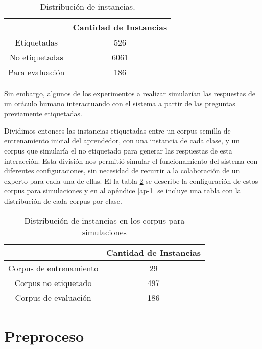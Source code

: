 \begin{table}[h!]
\centering
\begin{tabular}{c c}
     & Cantidad de Instancias\\ [0.5ex]
    \hline
    Etiquetadas & 526 \\ [0.5ex]
    No etiquetadas & 6061 \\ [0.5ex]
    Para evaluación & 186 \\[1ex]
    \hline
\end{tabular}
\caption{Distribución de instancias.}\label{dist-corpus}
\end{table}

Sin embargo, algunos de los experimentos a realizar simularían las respuestas de un oráculo humano interactuando con el sistema a partir de las preguntas previamente etiquetadas.

Dividimos entonces las instancias etiquetadas entre un corpus semilla de entrenamiento inicial del aprendedor, con una instancia de cada clase, y un corpus que simularía el no etiquetado para generar las respuestas de esta interacción. Esta división nos permitió simular el funcionamiento del sistema con diferentes configuraciones, sin necesidad de recurrir a la colaboración de un experto para cada una de ellas. El la tabla \ref{corpus-para-simulacion} se describe la configuración de estos corpus para simulaciones y en al apéndice \ref{ap-1} se incluye una tabla con la distribución de cada corpus por clase.


\begin{table}[h!]
\centering
\begin{tabular}{c c}
     & Cantidad de Instancias\\ [0.5ex]
    \hline
    Corpus de entrenamiento & 29 \\ [0.5ex]
    Corpus no etiquetado & 497 \\ [0.5ex]
    Corpus de evaluación & 186 \\[1ex]
    \hline
\end{tabular}
\caption{Distribución de instancias en los corpus para simulaciones}\label{corpus-para-simulacion}
\end{table}

\section{Preproceso}

